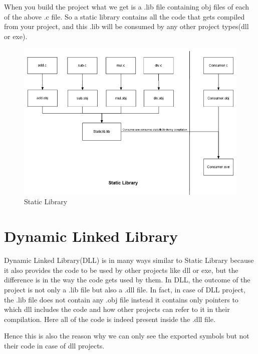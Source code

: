 \documentclass{article}
\begin{document}
When you build the project what we get is a .lib file containing obj files
of each of the above .c file. So a static library contains all
the code that gets compiled from your project, and this .lib will
be consumed by any other project types(dll or exe).

\begin{figure}[H]
\centering
\includegraphics[width=\textwidth]{1.StaticLib.png}
\caption{Static Library}
\end{figure}

\section{Dynamic Linked Library}
Dynamic Linked Library(DLL) is in many ways similar to Static Library because
it also provides the code to be used by other projects like dll or exe,
but the difference is in the way the code gets used by them.
In DLL, the outcome of the project is not only a .lib file but also a
.dll file. In fact, in case of DLL project, the .lib file does not contain
any .obj file instead it contains only pointers to which dll includes
the code and how other projects can refer to it in their compilation.
Here all of the code is indeed present inside the .dll file.

Hence this is also the reason why we can only see the exported symbols
but not their code in case of dll projects.
\end{document}
